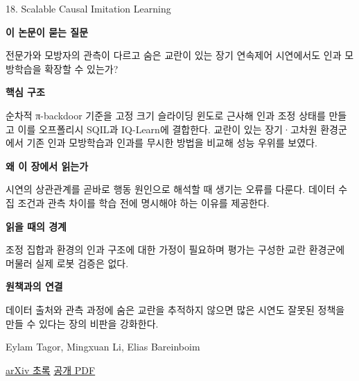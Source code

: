 \documentclass[11pt,openany]{book}
\begin{document}
\begin{termcard}{18. Scalable Causal Imitation Learning}

\par

\medskip

{\sffamily\bfseries\color{deepblue} 이 논문이 묻는 질문}\par

전문가와 모방자의 관측이 다르고 숨은 교란이 있는 장기 연속제어 시연에서도 인과 모방학습을 확장할 수 있는가?

\smallskip

{\sffamily\bfseries\color{deepblue} 핵심 구조}\par

순차적 π-backdoor 기준을 고정 크기 슬라이딩 윈도로 근사해 인과 조정 상태를 만들고 이를 오프폴리시 SQIL과 IQ-Learn에 결합한다. 교란이 있는 장기·고차원 환경군에서 기존 인과 모방학습과 인과를 무시한 방법을 비교해 성능 우위를 보였다.

\smallskip

{\sffamily\bfseries\color{deepblue} 왜 이 장에서 읽는가}\par

시연의 상관관계를 곧바로 행동 원인으로 해석할 때 생기는 오류를 다룬다. 데이터 수집 조건과 관측 차이를 학습 전에 명시해야 하는 이유를 제공한다.

\smallskip

{\sffamily\bfseries\color{coral} 읽을 때의 경계}\par

조정 집합과 환경의 인과 구조에 대한 가정이 필요하며 평가는 구성한 교란 환경군에 머물러 실제 로봇 검증은 없다.

\smallskip

{\sffamily\bfseries\color{teal} 원책과의 연결}\par

데이터 출처와 관측 과정에 숨은 교란을 추적하지 않으면 많은 시연도 잘못된 정책을 만들 수 있다는 장의 비판을 강화한다.

\medskip

{\footnotesize\color{muted} Eylam Tagor, Mingxuan Li, Elias Bareinboim\par

\href{https://arxiv.org/abs/2607.17003}{arXiv 초록} \quad \href{https://arxiv.org/pdf/2607.17003}{공개 PDF}\par}

\end{termcard}
\end{document}
